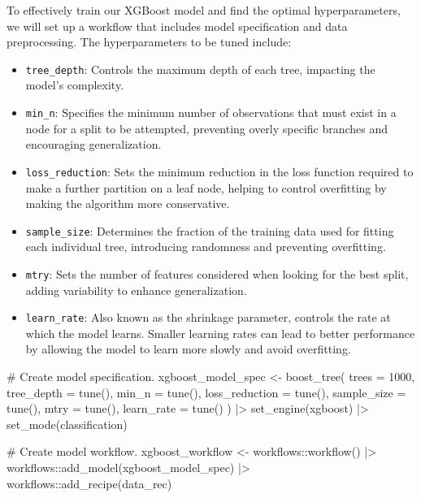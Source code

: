 \documentclass[
  letterpaper,
  DIV=11,
  numbers=noendperiod]{scrartcl}
\newenvironment{Shaded}{\begin{snugshade}}{\end{snugshade}}
\newcommand{\AttributeTok}[1]{\textcolor[rgb]{0.40,0.45,0.13}{#1}}
\newcommand{\CommentTok}[1]{\textcolor[rgb]{0.37,0.37,0.37}{#1}}
\newcommand{\DecValTok}[1]{\textcolor[rgb]{0.68,0.00,0.00}{#1}}
\newcommand{\FunctionTok}[1]{\textcolor[rgb]{0.28,0.35,0.67}{#1}}
\newcommand{\NormalTok}[1]{\textcolor[rgb]{0.00,0.23,0.31}{#1}}
\newcommand{\OtherTok}[1]{\textcolor[rgb]{0.00,0.23,0.31}{#1}}
\newcommand{\SpecialCharTok}[1]{\textcolor[rgb]{0.37,0.37,0.37}{#1}}
\newcommand{\StringTok}[1]{\textcolor[rgb]{0.13,0.47,0.30}{#1}}
\providecommand{\tightlist}{%
  \setlength{\itemsep}{0pt}\setlength{\parskip}{0pt}}\usepackage{longtable,booktabs,array}
\begin{document}
To effectively train our XGBoost model and find the optimal
hyperparameters, we will set up a workflow that includes model
specification and data preprocessing. The hyperparameters to be tuned
include:

\begin{itemize}
\tightlist
\item
  \texttt{tree\_depth}: Controls the maximum depth of each tree,
  impacting the model's complexity.
\item
  \texttt{min\_n}: Specifies the minimum number of observations that
  must exist in a node for a split to be attempted, preventing overly
  specific branches and encouraging generalization.
\item
  \texttt{loss\_reduction}: Sets the minimum reduction in the loss
  function required to make a further partition on a leaf node, helping
  to control overfitting by making the algorithm more conservative.
\item
  \texttt{sample\_size}: Determines the fraction of the training data
  used for fitting each individual tree, introducing randomness and
  preventing overfitting.
\item
  \texttt{mtry}: Sets the number of features considered when looking for
  the best split, adding variability to enhance generalization.
\item
  \texttt{learn\_rate}: Also known as the shrinkage parameter, controls
  the rate at which the model learns. Smaller learning rates can lead to
  better performance by allowing the model to learn more slowly and
  avoid overfitting.
\end{itemize}

\begin{Shaded}
\begin{Highlighting}[]
\CommentTok{\# Create model specification.}
\NormalTok{xgboost\_model\_spec }\OtherTok{\textless{}{-}} 
  \FunctionTok{boost\_tree}\NormalTok{(}
    \AttributeTok{trees =} \DecValTok{1000}\NormalTok{,}
    \AttributeTok{tree\_depth =} \FunctionTok{tune}\NormalTok{(), }
    \AttributeTok{min\_n =} \FunctionTok{tune}\NormalTok{(),}
    \AttributeTok{loss\_reduction =} \FunctionTok{tune}\NormalTok{(),}
    \AttributeTok{sample\_size =} \FunctionTok{tune}\NormalTok{(), }
    \AttributeTok{mtry =} \FunctionTok{tune}\NormalTok{(),}
    \AttributeTok{learn\_rate =} \FunctionTok{tune}\NormalTok{()}
\NormalTok{  ) }\SpecialCharTok{|\textgreater{}}
  \FunctionTok{set\_engine}\NormalTok{(}\StringTok{\textquotesingle{}xgboost\textquotesingle{}}\NormalTok{) }\SpecialCharTok{|\textgreater{}}
  \FunctionTok{set\_mode}\NormalTok{(}\StringTok{\textquotesingle{}classification\textquotesingle{}}\NormalTok{)}

\CommentTok{\# Create model workflow.}
\NormalTok{xgboost\_workflow }\OtherTok{\textless{}{-}}\NormalTok{ workflows}\SpecialCharTok{::}\FunctionTok{workflow}\NormalTok{() }\SpecialCharTok{|\textgreater{}}
\NormalTok{  workflows}\SpecialCharTok{::}\FunctionTok{add\_model}\NormalTok{(xgboost\_model\_spec) }\SpecialCharTok{|\textgreater{}}
\NormalTok{  workflows}\SpecialCharTok{::}\FunctionTok{add\_recipe}\NormalTok{(data\_rec)}
\end{Highlighting}
\end{Shaded}
\end{document}
